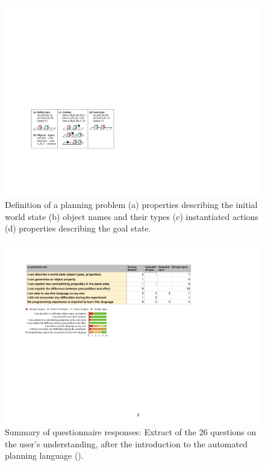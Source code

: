\begin{figure}[ht]
	\centering
	\includegraphics[width=0.7\linewidth]{figures/planning-permutation}
	\caption{Definition of a planning problem (a) properties describing the initial world state (b) object names and their types (c) instantiated actions (d) properties describing the goal state.}
	\label{fig:planning-permutation}
\end{figure}

\begin{figure}[ht]
	\centering
	\includegraphics[width=0.85\linewidth]{figures/eEvaluation2}
	\caption{Summary of questionnaire responses: Extract of the 26 questions on the user's understanding, after the introduction to the automated planning language ().}
	\label{fig:eEvaluation2}
\end{figure} 

